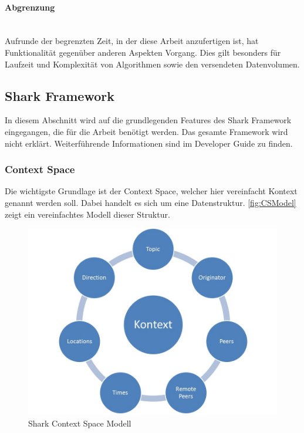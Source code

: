 \documentclass[a4paper]{article}
\begin{document}
	\paragraph{Abgrenzung} \mbox{} \\
	
	Aufrunde der begrenzten Zeit, in der diese Arbeit anzufertigen ist, hat
	Funktionalität gegenüber anderen Aspekten Vorgang. Dies gilt besonders
	für Laufzeit und Komplexität von Algorithmen sowie den versendeten 
	Datenvolumen.
	
	\subsection{Shark Framework}
	
	In diesem Abschnitt wird auf die grundlegenden Features des Shark
	Framework \cite{SharkFW} eingegangen, die für die Arbeit benötigt werden. 	
	Das gesamte	Framework wird nicht erklärt. Weiterführende Informationen sind
	im Developer Guide \cite{SharkManual} zu finden.
	
	\subsubsection{Context Space} 
	\label{sec:CS}
	
	Die wichtigste Grundlage ist der Context Space, welcher hier vereinfacht Kontext
	genannt werden soll. Dabei handelt es sich um eine Datenstruktur.
	\autoref{fig:CSModel} zeigt ein vereinfachtes Modell dieser Struktur.
	
	\begin{figure}[H] 
		\includegraphics[width=\linewidth]{../Bilder/contextspace.jpg}
		\caption{Shark Context Space Modell}
		\label{fig:CSModel}
	\end{figure}
	
\end{document}
